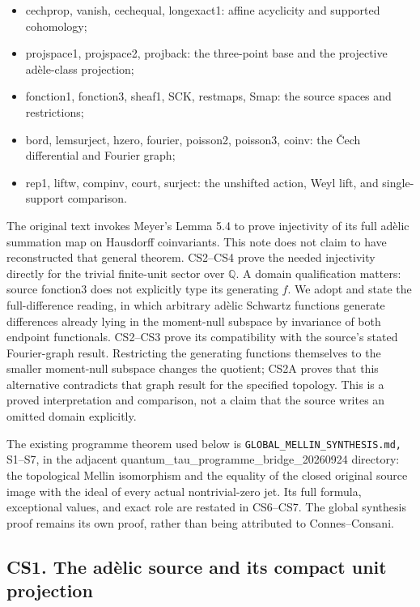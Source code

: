 \begin{itemize}
\tightlist
\item
  cechprop, vanish, cechequal, longexact1: affine acyclicity and
  supported cohomology;
\item
  projspace1, projspace2, projback: the three-point base and the
  projective adèle-class projection;
\item
  fonction1, fonction3, sheaf1, SCK, restmaps, Smap: the source spaces
  and restrictions;
\item
  bord, lemsurject, hzero, fourier, poisson2, poisson3, coinv: the Čech
  differential and Fourier graph;
\item
  rep1, liftw, compinv, court, surject: the unshifted action, Weyl lift,
  and single-support comparison.
\end{itemize}

The original text invokes Meyer's Lemma 5.4 to prove injectivity of its
full adèlic summation map on Hausdorff coinvariants. This note does not
claim to have reconstructed that general theorem. CS2--CS4 prove the
needed injectivity directly for the trivial finite-unit sector over
\(\mathbb Q\). A domain qualification matters: source fonction3 does not
explicitly type its generating \(f\). We adopt and state the
full-difference reading, in which arbitrary adèlic Schwartz functions
generate differences already lying in the moment-null subspace by
invariance of both endpoint functionals. CS2--CS3 prove its
compatibility with the source's stated Fourier-graph result. Restricting
the generating functions themselves to the smaller moment-null subspace
changes the quotient; CS2A proves that this alternative contradicts that
graph result for the specified topology. This is a proved interpretation
and comparison, not a claim that the source writes an omitted domain
explicitly.

The existing programme theorem used below is
\nolinkurl{GLOBAL_MELLIN_SYNTHESIS.md,} S1--S7, in the adjacent
quantum\_tau\_programme\_bridge\_20260924 directory: the topological
Mellin isomorphism and the equality of the closed original source image
with the ideal of every actual nontrivial-zero jet. Its full formula,
exceptional values, and exact role are restated in CS6--CS7. The global
synthesis proof remains its own proof, rather than being attributed to
Connes--Consani.

\subsection{CS1. The adèlic source and its compact unit
projection}\label{cs1.-the-aduxe8lic-source-and-its-compact-unit-projection}

